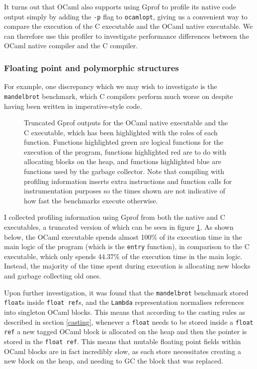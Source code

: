 \documentclass[12pt,a4paper,twoside,openright]{report}
\begin{document}
It turns out that OCaml also supports using Gprof to profile its native code 
output simply by adding the \texttt{-p} flag to \texttt{ocamlopt}, giving us a 
convenient way to compare the execution of the C executable and the OCaml 
native executable. We can therefore use this profiler to investigate 
performance differences between the OCaml native compiler and the C compiler.

\subsubsection{Floating point and polymorphic structures} \label{float-alloc}

For example, one discrepancy which we may wish to investigate is the 
\texttt{mandelbrot} benchmark, which C compilers perform much worse on despite 
having been written in imperative-style code.

\begin{figure}
    \label{fig:mandelbrot-gprof}
    \centering
    
    \caption{Truncated Gprof outputs for the OCaml native executable and the C 
    executable, which has been highlighted with the roles of each function. 
    Functions highlighted green are logical functions for the execution of the 
    program, functions highlighted red are to do with allocating blocks on the 
    heap, and functions highlighted blue are functions used by the garbage 
    collector.
    Note that compiling with profiling information inserts extra instructions 
    and function calls for instrumentation purposes so the times shown are not 
    indicative of how fast the benchmarks execute otherwise.}
\end{figure}

I collected profiling information using Gprof from both the native and C 
executables, a truncated version of which can be seen in figure 
\ref{fig:mandelbrot-gprof}. As shown below, the OCaml executable spends almost 
100\% of its execution time in the main logic of the program (which is the 
\texttt{entry} function), in comparison to the C executable, which only spends 
44.37\% of the execution time in the main logic. Instead, the majority of the 
time spent during execution is allocating new blocks and garbage collecting old 
ones.

Upon further investigation, it was found that the \texttt{mandelbrot} benchmark 
stored \texttt{float}s inside \texttt{float ref}s, and the \texttt{Lambda} 
representation normalises references into singleton OCaml blocks. This means 
that according to the casting rules as described in section \ref{casting}, 
whenever a \texttt{float} needs to be stored inside a \texttt{float ref} a new 
tagged OCaml block is allocated on the heap and then the pointer is stored in 
the \texttt{float ref}. This means that mutable floating point fields within 
OCaml blocks are in fact incredibly slow, as each store necessitates creating a 
new block on the heap, and needing to GC the block that was replaced.
\end{document}

